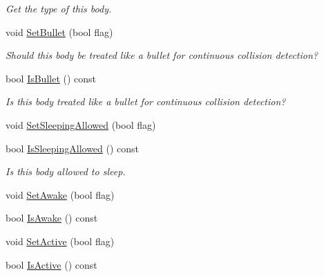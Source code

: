 \begin{DoxyCompactItemize}
\begin{DoxyCompactList}\small\item\em Get the type of this body. \end{DoxyCompactList}\item 
void \hyperlink{classb2_body_a3253af3725b8d6d63d8223bcd2ddab5c}{Set\+Bullet} (bool flag)\hypertarget{classb2_body_a3253af3725b8d6d63d8223bcd2ddab5c}{}\label{classb2_body_a3253af3725b8d6d63d8223bcd2ddab5c}

\begin{DoxyCompactList}\small\item\em Should this body be treated like a bullet for continuous collision detection? \end{DoxyCompactList}\item 
bool \hyperlink{classb2_body_af48509b43c9474b394cf76d733b56882}{Is\+Bullet} () const \hypertarget{classb2_body_af48509b43c9474b394cf76d733b56882}{}\label{classb2_body_af48509b43c9474b394cf76d733b56882}

\begin{DoxyCompactList}\small\item\em Is this body treated like a bullet for continuous collision detection? \end{DoxyCompactList}\item 
void \hyperlink{classb2_body_a229a6de228416203fecbf7a7544c33bb}{Set\+Sleeping\+Allowed} (bool flag)
\item 
bool \hyperlink{classb2_body_ac0b0c558008bda8cf7984dbaf2ee3aea}{Is\+Sleeping\+Allowed} () const \hypertarget{classb2_body_ac0b0c558008bda8cf7984dbaf2ee3aea}{}\label{classb2_body_ac0b0c558008bda8cf7984dbaf2ee3aea}

\begin{DoxyCompactList}\small\item\em Is this body allowed to sleep. \end{DoxyCompactList}\item 
void \hyperlink{classb2_body_ac72ed3df52a26c33db82252ab57399af}{Set\+Awake} (bool flag)
\item 
bool \hyperlink{classb2_body_aa28fdb95dffac89d20b04bd1a038b4ea}{Is\+Awake} () const 
\item 
void \hyperlink{classb2_body_ab8059b7b3e3b64aee17b54f68f7dde80}{Set\+Active} (bool flag)
\item 
bool \hyperlink{classb2_body_ae69b9cb7461ee165b6459ce43d648479}{Is\+Active} () const \hypertarget{classb2_body_ae69b9cb7461ee165b6459ce43d648479}{}\label{classb2_body_ae69b9cb7461ee165b6459ce43d648479}


\end{DoxyCompactItemize}
